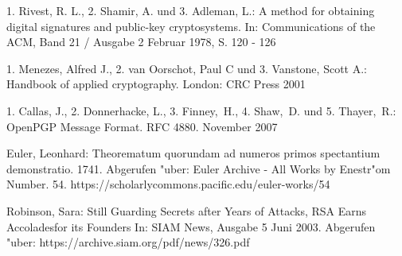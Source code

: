 \begin{thebibliography}{9}
1. Rivest, R. L., 2. Shamir, A. und 3. Adleman, L.:
A method for obtaining digital signatures and public-key cryptosystems.
In: Communications of the ACM, Band 21 / Ausgabe 2 Februar 1978, S. 120 - 126

1. Menezes, Alfred J., 2. van Oorschot, Paul C und 3. Vanstone, Scott A.:
Handbook of applied cryptography.
London: CRC Press 2001

1. Callas, J., 2. Donnerhacke, L., 3. Finney,~H., 4. Shaw,~D. und 5. Thayer,~R.:
OpenPGP Message Format. RFC 4880. November 2007

Euler, Leonhard: Theorematum quorundam ad numeros primos spectantium demonstratio.
1741. Abgerufen "uber: Euler Archive - All Works by Enestr"om Number. 54.
https://scholarlycommons.pacific.edu/euler-works/54

Robinson, Sara: Still Guarding Secrets after Years of Attacks, RSA Earns Accoladesfor its Founders
In: SIAM News, Ausgabe 5 Juni 2003.
Abgerufen "uber: https://archive.siam.org/pdf/news/326.pdf

\piicitations
\end{thebibliography}
